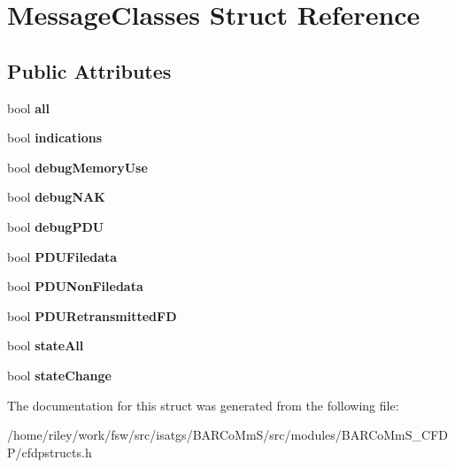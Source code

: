 \hypertarget{struct_message_classes}{}\section{Message\+Classes Struct Reference}
\label{struct_message_classes}
\subsection*{Public Attributes}
\begin{DoxyCompactItemize}
\item 
bool {\bfseries all}\hypertarget{struct_message_classes_a459558add80cc299ef30b600678a6a9c}{}\label{struct_message_classes_a459558add80cc299ef30b600678a6a9c}

\item 
bool {\bfseries indications}\hypertarget{struct_message_classes_ada72923f89c3907adb6f37779b661cd3}{}\label{struct_message_classes_ada72923f89c3907adb6f37779b661cd3}

\item 
bool {\bfseries debug\+Memory\+Use}\hypertarget{struct_message_classes_a19e0d88e17d1024dc460f805506d645d}{}\label{struct_message_classes_a19e0d88e17d1024dc460f805506d645d}

\item 
bool {\bfseries debug\+N\+AK}\hypertarget{struct_message_classes_a5b2f5a45eb2479cb9a28d303b67a1ca8}{}\label{struct_message_classes_a5b2f5a45eb2479cb9a28d303b67a1ca8}

\item 
bool {\bfseries debug\+P\+DU}\hypertarget{struct_message_classes_ad0788d080ecf37d92e7a208f4b609111}{}\label{struct_message_classes_ad0788d080ecf37d92e7a208f4b609111}

\item 
bool {\bfseries P\+D\+U\+Filedata}\hypertarget{struct_message_classes_a07f8452b10aa59778bef0d495ab8214e}{}\label{struct_message_classes_a07f8452b10aa59778bef0d495ab8214e}

\item 
bool {\bfseries P\+D\+U\+Non\+Filedata}\hypertarget{struct_message_classes_ad25fad59c0711cadb187c2333790a385}{}\label{struct_message_classes_ad25fad59c0711cadb187c2333790a385}

\item 
bool {\bfseries P\+D\+U\+Retransmitted\+FD}\hypertarget{struct_message_classes_ad4c2d314b335b141c8f3d89e9f359b3c}{}\label{struct_message_classes_ad4c2d314b335b141c8f3d89e9f359b3c}

\item 
bool {\bfseries state\+All}\hypertarget{struct_message_classes_a666f3e3f94abc6353ea695b860c1c64f}{}\label{struct_message_classes_a666f3e3f94abc6353ea695b860c1c64f}

\item 
bool {\bfseries state\+Change}\hypertarget{struct_message_classes_ae9310b35d91d21bf82b049817028a569}{}\label{struct_message_classes_ae9310b35d91d21bf82b049817028a569}

\end{DoxyCompactItemize}


The documentation for this struct was generated from the following file\+:\begin{DoxyCompactItemize}
\item 
/home/riley/work/fsw/src/isatgs/\+B\+A\+R\+Co\+Mm\+S/src/modules/\+B\+A\+R\+Co\+Mm\+S\+\_\+\+C\+F\+D\+P/cfdpstructs.\+h\end{DoxyCompactItemize}
